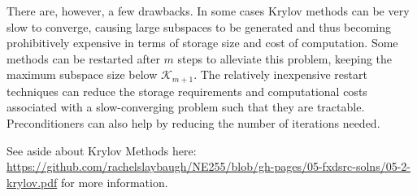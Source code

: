 \documentclass[12pt]{article}
\newcommand{\ve}[1]{\ensuremath{\mathbf{#1}}}
\begin{document}
There are, however, a few drawbacks. In some cases Krylov methods can be very slow to converge, causing large subspaces to be generated and thus becoming prohibitively expensive in terms of storage size and cost of computation. Some methods can be restarted after $m$ steps %
to alleviate this problem, keeping the maximum subspace size below $\mathcal{K}_{m+1}$.  The relatively inexpensive restart techniques can reduce the storage requirements and computational costs associated with a slow-converging problem such that they are tractable. Preconditioners can also help by reducing the number of iterations needed. %


See aside about Krylov Methods here: \href{ https://github.com/rachelslaybaugh/NE255/blob/gh-pages/05-fxdsrc-solns/05-2-krylov.pdf}{ https://github.com/rachelslaybaugh/NE255/blob/gh-pages/05-fxdsrc-solns/05-2-krylov.pdf} for more information.
\end{document}
